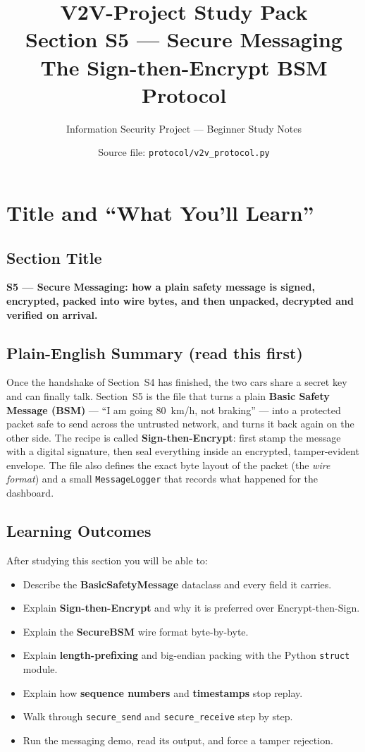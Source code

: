 \documentclass[11pt,a4paper]{article}
\title{\textbf{V2V-Project Study Pack}\\[4pt]
       \large Section S5 --- Secure Messaging\\
       \normalsize The Sign-then-Encrypt BSM Protocol}
\author{Information Security Project --- Beginner Study Notes}
\date{Source file: \texttt{protocol/v2v\_protocol.py}}
\begin{document}
\maketitle
\tableofcontents
\newpage

\section{Title and ``What You'll Learn''}

\subsection*{Section Title}
\textbf{S5 --- Secure Messaging: how a plain safety message is signed, encrypted,
packed into wire bytes, and then unpacked, decrypted and verified on arrival.}

\subsection*{Plain-English Summary (read this first)}
Once the handshake of Section~S4 has finished, the two cars share a secret key
and can finally talk. Section~S5 is the file that turns a plain
\textbf{Basic Safety Message (BSM)} --- ``I am going 80~km/h, not braking'' ---
into a protected packet safe to send across the untrusted network, and turns it
back again on the other side. The recipe is called \textbf{Sign-then-Encrypt}:
first stamp the message with a digital signature, then seal everything inside an
encrypted, tamper-evident envelope. The file also defines the exact byte layout
of the packet (the \emph{wire format}) and a small \texttt{MessageLogger} that
records what happened for the dashboard.

\subsection*{Learning Outcomes}
After studying this section you will be able to:
\begin{itemize}
  \item Describe the \textbf{BasicSafetyMessage} dataclass and every field it carries.
  \item Explain \textbf{Sign-then-Encrypt} and why it is preferred over
        Encrypt-then-Sign.
  \item Explain the \textbf{SecureBSM} wire format byte-by-byte.
  \item Explain \textbf{length-prefixing} and big-endian packing with the
        Python \texttt{struct} module.
  \item Explain how \textbf{sequence numbers} and \textbf{timestamps} stop replay.
  \item Walk through \texttt{secure\_send} and \texttt{secure\_receive} step by step.
  \item Run the messaging demo, read its output, and force a tamper rejection.
\end{itemize}
\end{document}
